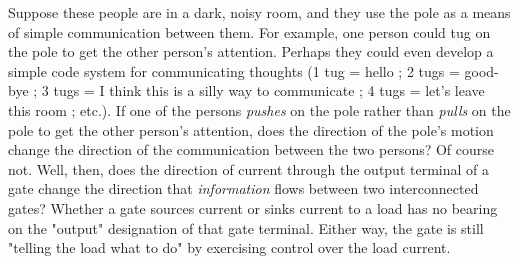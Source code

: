 Suppose these people are in a dark, noisy room, and they use the pole as a means of simple communication between them.  For example, one person could tug on the pole to get the other person's attention.  Perhaps they could even develop a simple code system for communicating thoughts (1 tug = hello ; 2 tugs = good-bye ; 3 tugs = I think this is a silly way to communicate ; 4 tugs = let's leave this room ; etc.).  If one of the persons {\it pushes} on the pole rather than {\it pulls} on the pole to get the other person's attention, does the direction of the pole's motion change the direction of the communication between the two persons?  Of course not.  Well, then, does the direction of current through the output terminal of a gate change the direction that {\it information} flows between two interconnected gates?  Whether a gate sources current or sinks current to a load has no bearing on the "output" designation of that gate terminal.  Either way, the gate is still "telling the load what to do" by exercising control over the load current.




